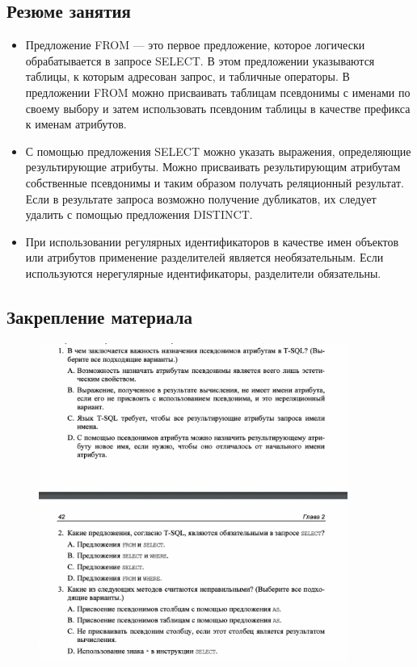 \subsection*{Резюме занятия}
\begin{itemize}
	\item Предложение FROM — это первое предложение, которое логически обрабатывается в запросе SELECT. В этом предложении указываются таблицы, к которым адресован запрос, и табличные операторы. В предложении FROM можно присваивать таблицам псевдонимы с именами по своему выбору и затем использовать псевдоним таблицы в качестве префикса к именам атрибутов. 
	\item С помощью предложения SELECT можно указать выражения, определяющие результирующие атрибуты. Можно присваивать результирующим атрибутам собственные псевдонимы и таким образом получать реляционный результат. Если в результате запроса возможно получение дубликатов, их следует удалить с помощью предложения DISTINCT.
	\item При использовании регулярных идентификаторов в качестве имен объектов или атрибутов применение разделителей является необязательным. Если используются нерегулярные идентификаторы, разделители обязательны. 
\end{itemize}

\subsection*{Закрепление материала}

\begin{figure}[h!]
	\begin{center}
		\includegraphics[width=0.9\textwidth]{img/zakrep3.png}
	\end{center}
	\captionsetup{justification=centering}
\end{figure}
\newpage

